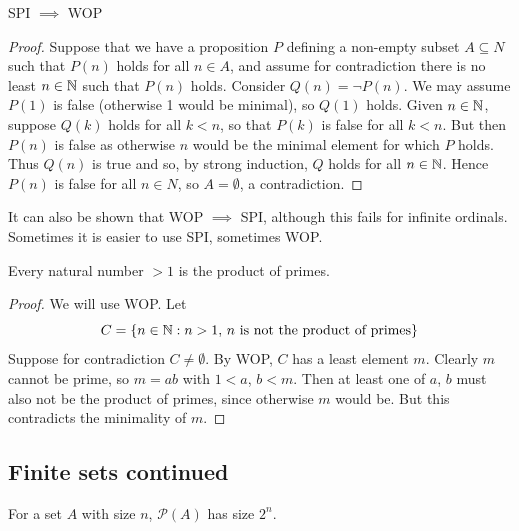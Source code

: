 \documentclass{../../template/note}
\begin{document}
    \begin{proposition}
        SPI \(\implies\) WOP
    \end{proposition}
    
    \begin{proof}
        Suppose that we have a proposition \(P\) defining a non-empty subset \(A \subseteq N\) such that \(P(n)\) holds for all \(n \in A\), and assume for contradiction there is no least \(n \in \mathbb N\) such that \(P(n)\) holds. Consider \(Q(n) = \neg P(n)\). We may assume \(P(1)\) is false (otherwise 1 would be minimal), so \(Q(1)\) holds. Given \(n \in \mathbb N\), suppose \(Q(k)\) holds for all \(k < n\), so that \(P(k)\) is false for all \(k < n\). But then \(P(n)\) is false as otherwise \(n\) would be the minimal element for which \(P\) holds. Thus \(Q(n)\) is true and so, by strong induction, \(Q\) holds for all \(n \in \mathbb N\). Hence \(P(n)\) is false for all \(n \in N\), so \(A = \emptyset\), a contradiction.
    \end{proof}
    
    \begin{remark*}
        It can also be shown that WOP \(\implies\) SPI, although this fails for infinite ordinals. Sometimes it is easier to use SPI, sometimes WOP.
    \end{remark*}
    
    \begin{proposition}
        Every natural number \(>1\) is the product of primes.
        \label{fta-1}
    \end{proposition}
    
    \begin{proof}
        We will use WOP. Let
        \[
            C = \{n \in \mathbb N: n > 1,\, n \text{ is not the product of primes}\}
        \]
        Suppose for contradiction \(C \neq \emptyset\). By WOP, \(C\) has a least element \(m\). Clearly \(m\) cannot be prime, so \(m = ab\) with \(1 < a\), \(b < m\). Then at least one of \(a\), \(b\) must also not be the product of primes, since otherwise \(m\) would be. But this contradicts the minimality of \(m\).
    \end{proof}
    
    \subsection{Finite sets continued}

    \begin{proposition}
        For a set \(A\) with size \(n\), \(\mathcal P(A)\) has size \(2^n\).
    \end{proposition}
    
\end{document}
